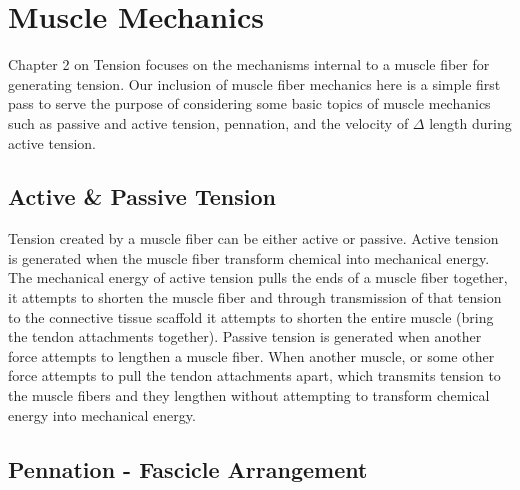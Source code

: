 \section{Muscle Mechanics}

Chapter 2 on Tension focuses on the mechanisms internal to a muscle fiber for generating tension. Our inclusion of muscle fiber mechanics here is a simple first pass to serve the purpose of considering some basic topics of muscle mechanics such as passive and active tension, pennation, and the velocity of $\Delta$ length\footnotemark{} during active tension.

\subsection{Active \& Passive Tension}

Tension created by a muscle fiber can be either active or passive. Active tension is generated when the muscle fiber transform chemical into mechanical energy. The mechanical energy of active tension pulls the ends of a muscle fiber together, it attempts to shorten the muscle fiber and through transmission of that tension to the connective tissue scaffold it attempts to shorten the entire muscle (bring the tendon attachments together). Passive tension is generated when another force attempts to lengthen a muscle fiber. When another muscle, or some other force attempts to pull the tendon attachments apart, which transmits tension to the muscle fibers and they lengthen without attempting to transform chemical energy into mechanical energy. 

\subsection{Pennation - Fascicle Arrangement}

